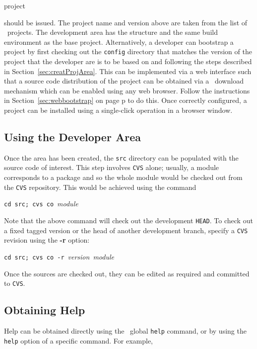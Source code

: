 \begin{scramcmd}{project}
  ~
\end{scramcmd}

\ni should be issued. The project name and version above are taken
from the list of \scram\ projects. The development area has the
structure and the same build environment as the base project.
Alternatively, a developer can bootstrap a project by first
checking out the \texttt{config} directory that matches the version of
the project that the developer are is to be based on and following the
steps described in Section~\ref{sec:creatProjArea}.
This can be implemented via a web interface such that a
source code distribution of the project can be obtained via a \scram\
download mechanism which can be enabled using any web browser. Follow
the instructions in Section~\ref{sec:webbootstrap} on page 
p\pageref{sec:webbootstrap} to do this. Once
correctly configured, a project can be installed using a single-click
operation in a browser window. 

\subsection{Using the Developer Area}\label{sec:usingscramdevarea}
\index{SCRAM developer area!using a}

Once the area has been created, the \texttt{src} directory can be
populated with the source code of interest. This step
involves \texttt{CVS} alone; usually, a module corresponds to a package and so
the whole module would be checked out from the \texttt{CVS} repository. This
would be achieved using the command

\texttt{cd src;}~\texttt{cvs co}~\textit{module}

\ni Note that the above command will check out the development
\texttt{HEAD}. To check out a fixed tagged version or the head of
another development branch, specify a \texttt{CVS} revision using the {\bf -r}
option:

\texttt{cd src;}~\texttt{cvs co -r}~\textit{version}~\textit{module}

\ni Once the sources are checked out, they can be edited as required
and committed to \texttt{CVS}.


\subsection{Obtaining Help}\label{sec:gettinghelp}
Help can be obtained directly using the \scram\ global \texttt{help}
command, or by using the \texttt{help} option of a specific command.
For example,

